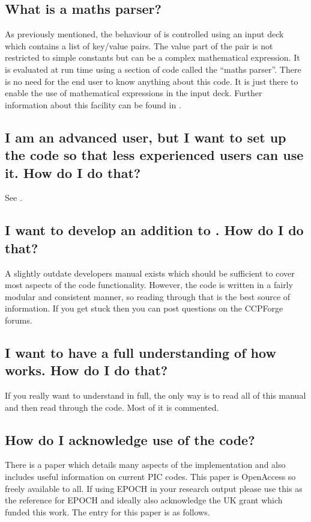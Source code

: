 \subsection{What is a maths parser?}
As previously mentioned, the behaviour of {\EPOCH} is controlled using an
input deck which contains a list of key/value pairs. The value part of the
pair is not restricted to simple constants but can be a complex mathematical
expression. It is evaluated at run time using a section of code called the
``maths parser''. There is no need for the end user to know anything about this
code. It is just there to enable the use of mathematical expressions in the
input deck.
Further information about this facility can be found in
.

\subsection{I am an advanced user, but I want to set up the code so that less
  experienced users can use it. How do I do that?}
See .

\subsection{I want to develop an addition to {\EPOCH}. How do I do that?}
A slightly outdate developers manual exists which should be sufficient to
cover most aspects of the code functionality. However, the code is written
in a fairly modular and consistent manner, so reading through that
is the best source of information. If you get stuck then you can post
questions on the CCPForge forums.

\subsection{I want to have a full understanding of how {\EPOCH} works. How do I
  do that?}
If you really want to understand {\EPOCH}
in full, the only way is to read all of
this manual and then read through the code. Most of it is commented.

\subsection{How do I acknowledge use of the code?}
There is a paper which details many aspects of the {\EPOCH} implementation
and also includes useful information on current PIC codes. This paper is
OpenAccess so freely available to all. If using EPOCH in
your research output please use this as the reference for EPOCH and ideally
also acknowledge the UK grant which funded this work.
The  entry for this paper is as follows.

